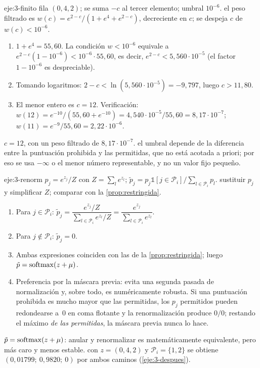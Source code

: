 \begin{solucion}{eje:3-finito}
\datos fila $(0,4,2)$; se suma $-c$ al tercer elemento; umbral $10^{-6}$.
\planteamiento el peso filtrado es $w(c)=e^{2-c}/(1+e^{4}+e^{2-c})$, decreciente en $c$; se despeja $c$ de $w(c)<10^{-6}$.
\pasos
\begin{enumerate}[label=\arabic*.]
  \item $1+e^{4}=55{,}60$. La condición $w<10^{-6}$ equivale a $e^{2-c}(1-10^{-6})<10^{-6}\cdot55{,}60$, es decir, $e^{2-c}<5{,}560\cdot10^{-5}$ (el factor $1-10^{-6}$ es despreciable).
  \item Tomando logaritmos: $2-c<\ln(5{,}560\cdot10^{-5})=-9{,}797$, luego $c>11{,}80$.
  \item El menor entero es $c=12$. Verificación: $w(12)=e^{-10}/(55{,}60+e^{-10})=4{,}540\cdot10^{-5}/55{,}60=8{,}17\cdot10^{-7}$; $w(11)=e^{-9}/55{,}60=2{,}22\cdot10^{-6}$.
\end{enumerate}
\resultado \textbf{$c=12$}, con un peso filtrado de $8{,}17\cdot10^{-7}$.
\comprobacion el umbral depende de la diferencia entre la puntuación prohibida y las permitidas, que no está acotada a priori; por eso se usa $-\infty$ o el menor número representable, y no un valor fijo pequeño.
\end{solucion}

\begin{solucion}{eje:3-renorm}
\datos $p_j=e^{z_j}/Z$ con $Z=\sum_le^{z_l}$; $\tilde p_j=p_j\mathbb{1}[j\in\mathcal{P}_i]/\sum_{l\in\mathcal{P}_i}p_l$.
\planteamiento sustituir $p_j$ y simplificar $Z$; comparar con la \cref{prop:restringida}.
\pasos
\begin{enumerate}[label=\arabic*.]
  \item Para $j\in\mathcal{P}_i$: $\tilde p_j=\dfrac{e^{z_j}/Z}{\sum_{l\in\mathcal{P}_i}e^{z_l}/Z}=\dfrac{e^{z_j}}{\sum_{l\in\mathcal{P}_i}e^{z_l}}$.
  \item Para $j\notin\mathcal{P}_i$: $\tilde p_j=0$.
  \item Ambas expresiones coinciden con las de la \cref{prop:restringida}; luego $\tilde p=\operatorname{softmax}(z+\mu)$.
  \item Preferencia por la máscara previa: evita una segunda pasada de normalización y, sobre todo, es numéricamente robusta. Si una puntuación prohibida es mucho mayor que las permitidas, los $p_j$ permitidos pueden redondearse a~0 en coma flotante y la renormalización produce $0/0$; restando el máximo \emph{de las permitidas}, la máscara previa nunca lo hace.
\end{enumerate}
\resultado \textbf{$\tilde p=\operatorname{softmax}(z+\mu)$}: anular y renormalizar es matemáticamente equivalente, pero más caro y menos estable.
\comprobacion con $z=(0,4,2)$ y $\mathcal{P}_i=\{1,2\}$ se obtiene $(0{,}01799;\allowbreak\ 0{,}9820;\allowbreak\ 0)$ por ambos caminos (\cref{eje:3-despues}).
\end{solucion}

